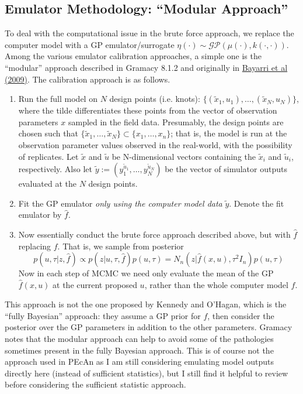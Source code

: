 \documentclass[12pt]{article}
\begin{document}
\subsection{Emulator Methodology: ``Modular Approach''}
To deal with the computational issue in the brute force approach, we replace the computer model with a GP emulator/surrogate $\eta(\cdot) \sim \mathcal{GP}(\mu(\cdot), k(\cdot, \cdot))$. 
Among the various emulator calibration approaches, a simple one is the ``modular'' approach described in Gramacy 8.1.2 and originally in 
\href{https://projecteuclid.org/journals/bayesian-analysis/volume-4/issue-1/Modularization-in-Bayesian-analysis-with-emphasis-on-analysis-of-computer/10.1214/09-BA404.full}{Bayarri et al (2009)}. 
The calibration approach is as follows. 
\begin{enumerate}
\item Run the full model on $N$ design points (i.e. knots): $\{(\tilde{x}_1, u_1), \dots, (\tilde{x}_N, u_N)\}$, where the tilde differentiates these points from the vector of observation parameters $x$
sampled in the field data. Presumably, the design points are chosen such that $\{\tilde{x}_1, \dots, \tilde{x}_N\} \subset \{x_1, \dots, x_n\}$; that is, the model is run at the observation parameter
values observed in the real-world, with the possibility of replicates. Let $\tilde{x}$ and $\tilde{u}$ be N-dimensional vectors containing the 
$\tilde{x}_i$ and $\tilde{u}_i$, respectively. Also let $\tilde{y} := (y_1^{\tilde{u}_1}, \dots, y_N^{\tilde{u}_N})$ be the vector of simulator outputs evaluated at the $N$ design points. 
\item Fit the GP emulator \textit{only using the computer model data} $\tilde{y}$. Denote the fit emulator by $\hat{f}$. 
\item Now essentially conduct the brute force approach described above, but with $\hat{f}$ replacing $f$. That is, we sample from posterior
\[p(u, \tau|z, \hat{f}) \propto p(z|u, \tau, \hat{f})p(u, \tau) = N_n(z|\hat{f}(x, u), \tau^2 I_n)p(u, \tau)\]
Now in each step of MCMC we need only evaluate the mean of the GP $\hat{f}(x, u)$ at the current proposed $u$, rather than the whole computer model $f$. 
\end{enumerate}
This approach is not the one proposed by Kennedy and O'Hagan, which is the ``fully Bayesian'' approach: they assume a GP prior for $f$, then consider the posterior over the GP parameters
in addition to the other parameters. Gramacy notes that the modular approach can help to avoid some of the pathologies sometimes present in the fully Bayesian approach. This is of course not
the approach used in PEcAn as I am still considering emulating model outputs directly here (instead of sufficient statistics), but I still find it helpful to review before considering the sufficient 
statistic approach. 
\end{document}
